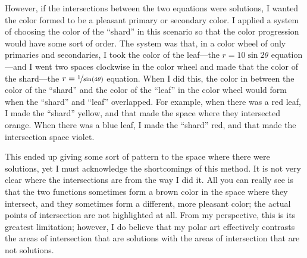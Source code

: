 However, if the intersections between the two equations were solutions, I wanted the color formed to be a pleasant primary or secondary color. I applied a system of choosing the color of the ``shard'' in this scenario so that the color progression would have some sort of order. The system was that, in a color wheel of only primaries and secondaries, I took the color of the leaf---the $r = 10\sin{2\theta}$ equation---and I went two spaces clockwise in the color wheel and made that the color of the shard---the $r = \nicefrac{1}{\sin(4\theta)}$ equation. When I did this, the color in between the color of the ``shard'' and the color of the ``leaf'' in the color wheel would form when the ``shard'' and ``leaf'' overlapped. For example, when there was a red leaf, I made the ``shard'' yellow, and that made the space where they intersected orange. When there was a blue leaf, I made the ``shard'' red, and that made the intersection space violet.

This ended up giving some sort of pattern to the space where there were solutions, yet I must acknowledge the shortcomings of this method. It is not very clear where the intersections are from the way I did it. All you can really see is that the two functions sometimes form a brown color in the space where they intersect, and they sometimes form a different, more pleasant color; the actual points of intersection are not highlighted at all. From my perspective, this is its greatest limitation; however, I do believe that my polar art effectively contrasts the areas of intersection that are solutions with the areas of intersection that are not solutions.
 
